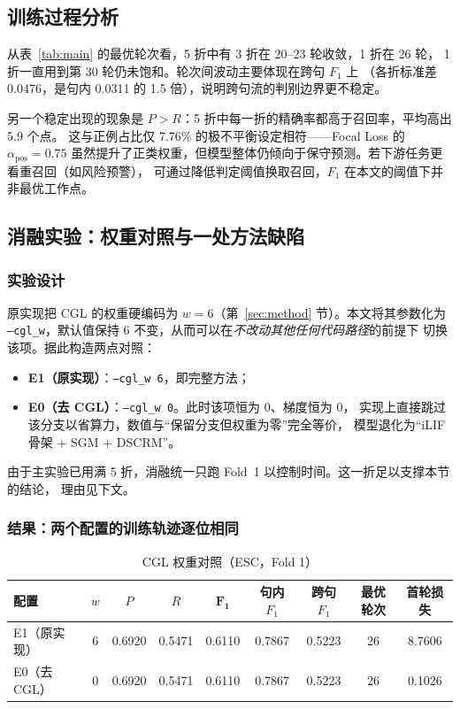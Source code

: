 \subsection{训练过程分析}

从表~\ref{tab:main} 的最优轮次看，5 折中有 3 折在 20--23 轮收敛，1 折在 26 轮，
1 折一直用到第 30 轮仍未饱和。轮次间波动主要体现在跨句 $F_1$ 上
（各折标准差 0.0476，是句内 0.0311 的 1.5 倍），说明跨句流的判别边界更不稳定。

另一个稳定出现的现象是 $P > R$：5 折中每一折的精确率都高于召回率，平均高出 5.9 个点。
这与正例占比仅 7.76\% 的极不平衡设定相符——Focal Loss 的 $\alpha_{\text{pos}}=0.75$
虽然提升了正类权重，但模型整体仍倾向于保守预测。若下游任务更看重召回（如风险预警），
可通过降低判定阈值换取召回，$F_1$ 在本文的阈值下并非最优工作点。

\subsection{消融实验：权重对照与一处方法缺陷}
\label{sec:ablation}

\subsubsection{实验设计}

原实现把 CGL 的权重硬编码为 $w=6$（第~\ref{sec:method} 节）。本文将其参数化为
\texttt{--cgl\_w}，默认值保持 6 不变，从而可以在\emph{不改动其他任何代码路径}的前提下
切换该项。据此构造两点对照：

\begin{itemize}
  \item \textbf{E1（原实现）}：\texttt{--cgl\_w 6}，即完整方法；
  \item \textbf{E0（去 CGL）}：\texttt{--cgl\_w 0}。此时该项恒为 0、梯度恒为 0，
        实现上直接跳过该分支以省算力，数值与“保留分支但权重为零”完全等价，
        模型退化为“iLIF 骨架 + SGM + DSCRM”。
\end{itemize}

由于主实验已用满 5 折，消融统一只跑 Fold~1 以控制时间。这一折足以支撑本节的结论，
理由见下文。

\subsubsection{结果：两个配置的训练轨迹逐位相同}

\begin{table}[H]
\centering
\caption{CGL 权重对照（ESC，Fold 1）}
\label{tab:ablation}
\small
\setlength{\tabcolsep}{3.5pt}
\begin{tabular}{lcccccccc}
\toprule
配置 & $w$ & $P$ & $R$ & $\bm{F_1}$ & 句内 $F_1$ & 跨句 $F_1$ & 最优轮次 & 首轮损失\\
\midrule
E1（原实现） & 6 & 0.6920 & 0.5471 & 0.6110 & 0.7867 & 0.5223 & 26 & 8.7606\\
E0（去 CGL） & 0 & 0.6920 & 0.5471 & 0.6110 & 0.7867 & 0.5223 & 26 & 0.1026\\
\bottomrule
\end{tabular}
\end{table}

